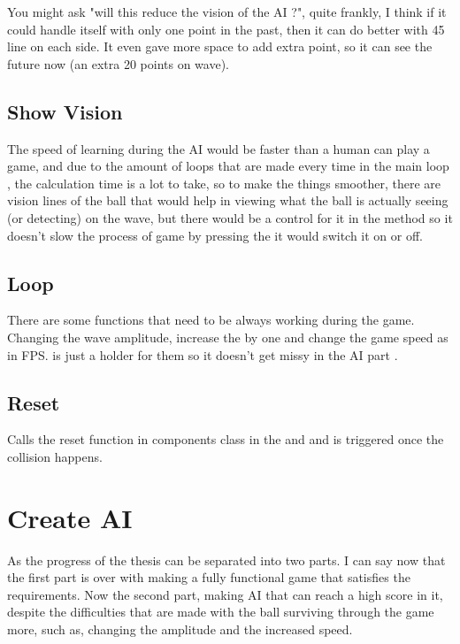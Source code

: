 You might ask "will this reduce the vision of the AI ?", quite frankly, I think if it could handle itself with only one point in the past, then it can do better with 45 line on each side. It even gave more space to add extra point, so it can see the future now (an extra 20 points on wave).

\subsection{Show Vision}
The speed of learning during the AI would be faster than a human can play a game, and due to the amount of loops that are made every time in the main loop , the calculation time is a lot to take, so to make the things smoother, there are vision lines of the ball that would help in viewing what the ball is actually seeing (or detecting) on the wave, but there would be a control for it in the  method so it doesn't slow the process of game by pressing the  it would switch it on or off. 

\subsection{Loop}
There are some functions that need to be always working during the game. Changing the wave amplitude, increase the  by one and change the game speed as in FPS.  is just a holder for them so it doesn't get missy in the AI part .

\subsection{Reset}
Calls the reset function in components class in the  and  and is triggered once the collision happens.

\section{Create AI}\label{create-ai}

As the progress of the thesis can be separated into two parts. I can say now that the first part is over with making a fully functional game that satisfies the requirements. Now the second part, making AI that can reach a high score in it, despite the difficulties that are made with the ball surviving through the game more, such as, changing the amplitude and the increased speed.

